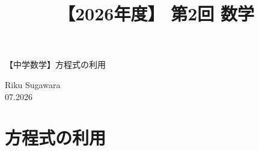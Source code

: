 \documentclass[12pt,a4paper]{jsarticle}
\title{【2026年度】 第2回 数学}                %
\author{}                     %
\date{}                       %
\begin{document}
\begin{center}
{\LARGE 【中学数学】方程式の利用}
\end{center}

\vspace{5mm}
\hfill Riku Sugawara \\
\hfill 07.2026


\section{方程式の利用}








\bookletpadpages
\end{document}
